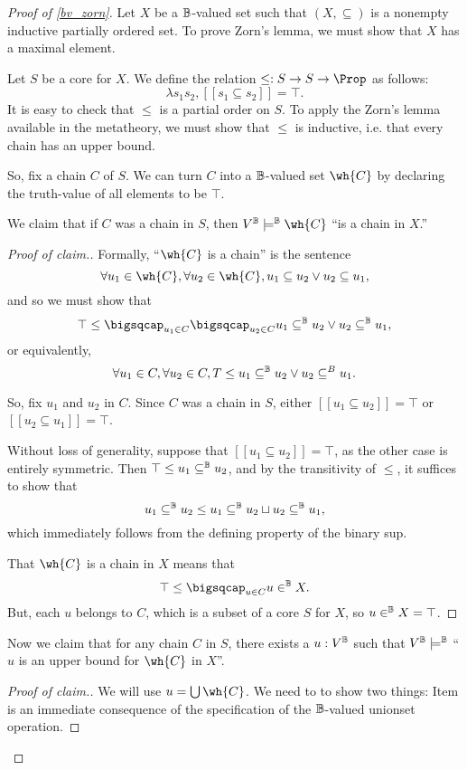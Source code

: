 \documentclass[11pt]{article}
\begin{document}
\begin{proof}[Proof of \ref{bv_zorn}]
  Let $X$ be a $\mathbb{B}$-valued set such that $(X, \subseteq)$ is a nonempty inductive partially ordered set. To prove Zorn's lemma, we must show that $X$ has a maximal element.

  Let $S$ be a core for $X$. We define the relation $\leq : S \to S \to \Prop$ as follows:
  $$
\lambda s_1 s_2, [[s_1 \subseteq s_2]] = \top.
$$
It is easy to check that $\leq$ is a partial order on $S$. To apply the Zorn's lemma available in the metatheory, we must show that $\leq$ is inductive, i.e. that every chain has an upper bound.

So, fix a chain $C$ of $S$. We can turn $C$ into a $\mathbb{B}$-valued set $\wh{C}$ by declaring the truth-value of all elements to be $\top$.

We claim that if $C$ was a chain in $S$, then $V^\B \models^\B \wh{C}$ ``is a chain in $X$.''
\begin{proof}[Proof of claim.]
  Formally, ``$\wh{C}$ is a chain'' is the sentence
  $$
\forall u_1 \in \wh{C}, \forall u_2 \in \wh{C}, u_1 \subseteq u_2 \lor u_2 \subseteq u_1,
$$
and so we must show that
$$
\top \leq \bigsqcap_{u_1 \in C} \bigsqcap_{u_2 \in C} u_1 \subseteq^\B u_2 \lor u_2 \subseteq^\B u_1,
$$
or equivalently,
$$
\forall u_1 \in C, \forall u_2 \in C, T \leq u_1 \subseteq^{\mathbb{B}} u_2 \lor u_2 \subseteq^B u_1.
$$

So, fix $u_1$ and $u_2$ in $C$. Since $C$ was a chain in $S$, either $[[u_1 \subseteq u_2]] = \top$ or $[[u_2 \subseteq u_1]] = \top$.

Without loss of generality, suppose that $[[u_1 \subseteq u_2]] = \top$, as the other case is entirely symmetric. Then $\top \leq u_1 \subseteq^{\mathbb{B}} u_2$, and by the transitivity of $\leq$, it suffices to show that
$$
u_1 \subseteq^{\mathbb{B}} u_2 \leq u_1 \subseteq^{\mathbb{B}} u_2 \sqcup u_2 \subseteq^{\mathbb{B}} u_1,
$$
which immediately follows from the defining property of the binary sup.

That $\wh{C}$ is a chain in $X$ means that
$$
\top \leq \bigsqcap_{u \in C} u \in^\B X.
$$
But, each $u$ belongs to $C$, which is a subset of a core $S$ for $X$, so $u \in^{\mathbb{B}} X = \top$.
\end{proof}

Now we claim that for any chain $C$ in $S$, there exists a $u : V^{\mathbb{B}}$ such that $V^{\mathbb{B}} \models^{\mathbb{B}}$ ``$u$ is an upper bound for $\wh{C}$ in $X$''.

\begin{proof}[Proof of claim.]
  We will use $u = \bigcup \wh{C}$. We need to to show two things:
  Item  is an immediate consequence of the specification of the $\mathbb{B}$-valued unionset operation.


\end{proof}
\end{proof}
\end{document}
